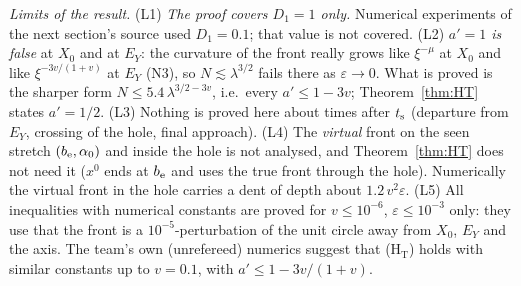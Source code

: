 \begin{remark}[Status]
\emph{Limits of the result.}
(L1) \emph{The proof covers $D_1=1$ only.} Numerical experiments of the next section's source used $D_1=0.1$; that value is not covered.
(L2) \emph{$a'=1$ is false} at $X_0$ and at $E_Y$: the curvature of the front really grows like $\xi^{-\mu}$ at $X_0$ and like
$\xi^{-3v/(1+v)}$ at $E_Y$ (N3), so $N\lesssim\lambda^{3/2}$ fails there as $\varepsilon\to0$. What is proved is the sharper form
$N\le5.4\,\lambda^{3/2-3v}$, i.e.\ every $a'\le1-3v$; Theorem~\ref{thm:HT} states $a'=1/2$.
(L3) Nothing is proved here about times after $t_{\mathrm s}$ (departure from $E_Y$, crossing of the hole, final approach).
(L4) The \emph{virtual} front on the seen stretch $(b_{\mathrm e},\alpha_0)$ and inside the hole is not analysed, and Theorem~\ref{thm:HT} does
not need it ($x^0$ ends at $b_{\mathrm e}$ and uses the true front through the hole). Numerically the virtual front in the hole carries a dent
of depth about $1.2\,v^2\varepsilon$.
(L5) All inequalities with numerical constants are proved for $v\le10^{-6}$, $\varepsilon\le10^{-3}$ only: they use that the front is
a $10^{-5}$-perturbation of the unit circle away from $X_0$, $E_Y$ and the axis. The team's own (unrefereed) numerics suggest that
\textup{(H$_{\mathrm T}$)} holds with similar constants up to $v=0.1$, with $a'\le1-3v/(1+v)$.
\end{remark}
